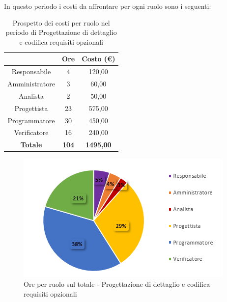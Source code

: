 \pagebreak
   In questo periodo i costi da affrontare per ogni ruolo sono i seguenti:
   
   \begin{table}[H]
       \centering
       \renewcommand{\arraystretch}{1.8}
       \begin{tabular}{c|c|c}
         \rowcolor[HTML]{125E28} 
         \multicolumn{1}{c}{\color[HTML]{FFFFFF}\textbf{Ruolo}}
         & \multicolumn{1}{c}{\color[HTML]{FFFFFF}\textbf{Ore}}
         & \multicolumn{1}{c}{\color[HTML]{FFFFFF}\textbf{Costo (€)}}\\
         \hline
         Responsabile   & 4 & 120,00\\
         Amministratore & 3 & 60,00\\
         Analista       & 2 & 50,00\\
         Progettista    & 23 & 575,00\\
         Programmatore  & 30 & 450,00\\
         Verificatore   & 16 & 240,00\\
         \textbf{Totale} & \textbf{104} & \textbf{1495,00}
       \end{tabular}
       \caption{Prospetto dei costi per ruolo nel periodo di Progettazione di dettaglio e codifica requisiti opzionali}
     \end{table}
   
     \begin{figure}[H]
       \centering
        \includegraphics[scale=0.9]{immagini/ore_ruolo_reqOpzionali.png}
        \caption{Ore per ruolo sul totale - Progettazione di dettaglio e codifica requisiti opzionali}
      \end{figure}
   
